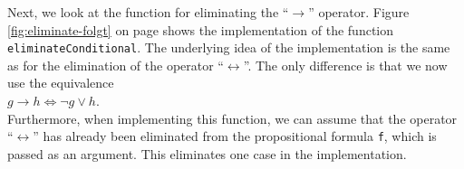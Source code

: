 Next, we look at the function for eliminating the ``$\rightarrow$'' operator. 
Figure
\ref{fig:eliminate-folgt} on page \pageref{fig:eliminate-folgt} shows the
implementation of the function
\texttt{eliminateConditional}.
The underlying idea of the implementation is the same as for the elimination of the
operator ``$\leftrightarrow$''.  The only difference is that we now use the
equivalence \\[0.2cm]
\hspace*{1.3cm}
$g \rightarrow h \Leftrightarrow \neg g \vee h$. \\[0.2cm]
Furthermore, when implementing this function, we can assume that the operator ``$\leftrightarrow$''
has already been eliminated from the propositional formula \texttt{f}, which is passed as an argument.
This eliminates one case in the implementation. 



